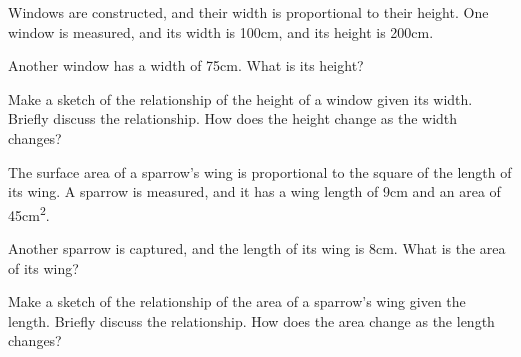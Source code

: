 \begin{problem}
  \clearpage

\item Windows are constructed, and their width is proportional to
  their height. One window is measured, and its width is 100cm, and its
  height is 200cm. 

  \begin{subproblem}

  \item Another window has a width of 75cm. What is its height?

    \vfill

  \item Make a sketch of the relationship of the height of a window
    given its width. Briefly discuss the relationship. How does the
    height change as the width changes?  

    \vfill
    
  \end{subproblem}

  \clearpage

\item The surface area of a sparrow's wing is proportional to the
  square of the length of its wing. A sparrow is measured, and it has
  a wing length of 9cm and an area of 45cm\textsuperscript{2}. 

  \begin{subproblem}

  \item Another sparrow is captured, and the length of its wing is
    8cm. What is the area of its wing?

    \vfill

  \item Make a sketch of the relationship of the area of a sparrow's
    wing given the length. Briefly discuss the relationship. How does
    the area change as the length changes?  

    \vfill

  \end{subproblem}

  \vfill



\end{problem}

\postClass

